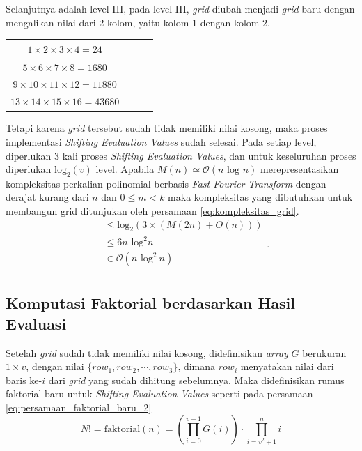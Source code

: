 Selanjutnya adalah level III, pada level III, \textit{grid} diubah menjadi \textit{grid} baru dengan mengalikan nilai dari 2 kolom, yaitu kolom 1 dengan kolom 2.
\begin{table}[H]
	\centering
	\begin{tabular}{|c|c|c|c|} \hline
	$ 1  \times 2 \times 3 \times 4  = 24 $ \\ \hline
	$ 5  \times 6 \times 7 \times 8  = 1680 $ \\ \hline
	$ 9  \times 10 \times 11 \times 12  = 11880 $ \\ \hline
	$ 13 \times 14 \times 15 \times 16  = 43680 $ \\ \hline
	\end{tabular}
\end{table}
Tetapi karena \textit{grid} tersebut sudah tidak memiliki nilai kosong, maka proses implementasi \textit{Shifting Evaluation Values} sudah selesai. Pada setiap level, diperlukan 3 kali proses \textit{Shifting Evaluation Values}, dan untuk keseluruhan proses diperlukan $ \text{log}_2 (v) $ level. Apabila $ M(n) \simeq \mathcal{O}{(n \text{ log } n)} $ merepresentasikan kompleksitas perkalian polinomial berbasis \textit{Fast Fourier Transform} dengan derajat kurang dari $ n $ dan $ 0 \leq m < k $ maka kompleksitas yang dibutuhkan untuk membangun grid ditunjukan oleh persamaan \eqref{eq:kompleksitas_grid}.
\begin{equation}
	\begin{aligned}
			 &\leq \text{log}_2 (3 \times (M(2n) + O(n))) \\
			 &\leq 6n\text{ log}^2 n \\
			 &\in \mathcal{O}{(n \text{ log}^2\ n)} \\
	\end{aligned}
	\label{eq:kompleksitas_grid}.
\end{equation}

\subsection{ Komputasi Faktorial berdasarkan Hasil Evaluasi}
Setelah \textit{grid} sudah tidak memiliki nilai kosong, didefinisikan \textit{array} $ G $ berukuran $ 1 \times v $, dengan nilai $ \{ row_1, row_2, \cdots, row_3 \} $, dimana $ row_i $ menyatakan nilai dari baris ke-$i$ dari \textit{grid} yang sudah dihitung sebelumnya. Maka didefinisikan rumus faktorial baru untuk \textit{Shifting Evaluation Values} seperti pada persamaan \eqref{eq:persamaan_faktorial_baru_2}
\begin{equation}
	N! = \text{faktorial}(n) = \left( \prod_{i=0}^{v-1} G(i) \right) \cdot \prod_{i=v^2+1}^n i
	\label{eq:persamaan_faktorial_baru_2}
\end{equation}

